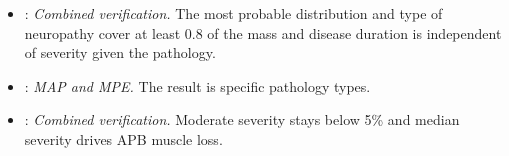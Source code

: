 \begingroup\raggedright
\begin{itemize}[nosep,leftmargin=*]
\item {}: \emph{Combined verification.}  The most probable distribution and type of neuropathy cover at least 0.8 of the mass and disease duration is independent of severity given the pathology.
\item {}: \emph{MAP and MPE.}  The result is specific pathology types.
\item {}: \emph{Combined verification.}  Moderate severity stays below 5\% and median severity drives APB muscle loss.
\end{itemize}
\endgroup
